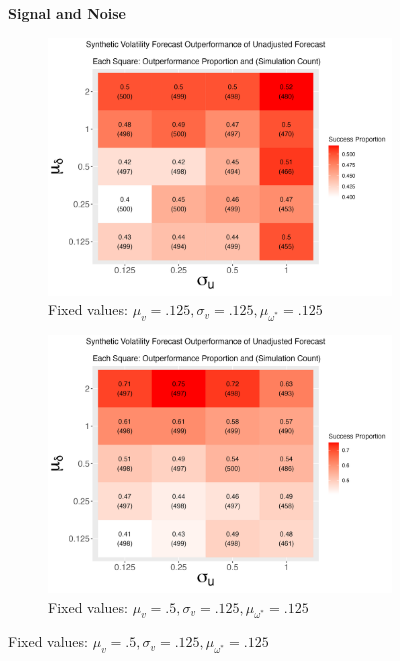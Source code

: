 \documentclass[11pt,3p,review,authoryear]{elsarticle}
\theoremstyle{definition}
\begin{document}
    \begin{figure}[!h]
      \centering
      \textbf{Signal and Noise}\par\medskip
    \begin{subfigure}{.44\linewidth} 
      \centering
        \includegraphics[scale = .42]{simulation_plots/Jul01_192350_2024_mu[delta]_sigma[u].png}
        \caption{Fixed values: $\mu_{v} = .125, \sigma_{v} = .125, \mu_{\omega^{*}} = .125$}\label{fig:sim_1}
    \end{subfigure}\hspace{12mm} %
    \begin{subfigure}{.44\linewidth} 
      \centering
        \includegraphics[scale=.42]{simulation_plots/Jul01_192510_2024_mu[delta]_sigma[u].png}
        \caption{Fixed values: $\mu_{v} = .5, \sigma_{v} = .125, \mu_{\omega^{*}} = .125$}\label{fig:sim_2}
    \end{subfigure}


\end{figure}
\end{document}
